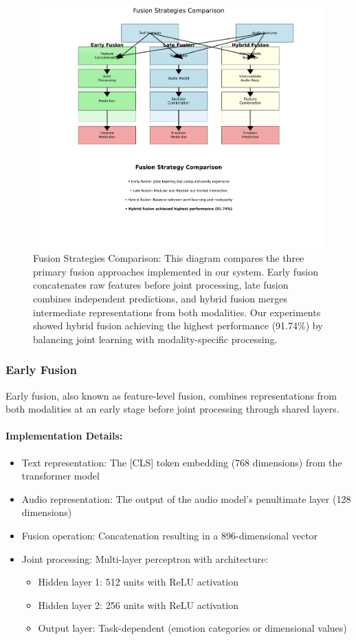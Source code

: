 \documentclass[12pt]{article}
\begin{document}
\begin{figure}[h]
    \centering
    \includegraphics[width=0.9\linewidth]{Figures/fusion_strategies_comparison.png}
    \caption{Fusion Strategies Comparison: This diagram compares the three primary fusion approaches implemented in our system. Early fusion concatenates raw features before joint processing, late fusion combines independent predictions, and hybrid fusion merges intermediate representations from both modalities. Our experiments showed hybrid fusion achieving the highest performance (91.74\%) by balancing joint learning with modality-specific processing.}
    \label{fig:fusion_strategies}
\end{figure}

\subsubsection{Early Fusion}
Early fusion, also known as feature-level fusion, combines representations from both modalities at an early stage before joint processing through shared layers.

\paragraph{Implementation Details:}
\begin{itemize}
    \item Text representation: The [CLS] token embedding (768 dimensions) from the transformer model
    \item Audio representation: The output of the audio model's penultimate layer (128 dimensions)
    \item Fusion operation: Concatenation resulting in a 896-dimensional vector
    \item Joint processing: Multi-layer perceptron with architecture:
    \begin{itemize}
        \item Hidden layer 1: 512 units with ReLU activation
        \item Hidden layer 2: 256 units with ReLU activation
        \item Output layer: Task-dependent (emotion categories or dimensional values)
    \end{itemize}
\end{itemize}
\end{document}
